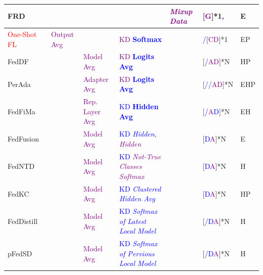 \begin{table}[htp]
\begin{longtable}{|p{1.68cm}|p{1.2cm}|p{1.25cm}|p{5.0cm}|p{2.59cm}|p{1.2cm}|p{0.35cm}|}
    FRD~\cite{cha2019federated}& & & & \textcolor{purple}{\textit{Mixup Data}} &[\textcolor{purple}{G}]*1\textcolor{purple}{,} & E \\ \hline

    \textcolor{red}{One-Shot FL}~\cite{guha2018one} & \textcolor{purple}{Output Avg} & & \textcolor{purple}{KD} \textcolor{blue}{\textbf{Softmax}} & & \textcolor{blue}{/}[\textcolor{purple}{CD}]*1 & EP \\ \hline %

    FedDF~\cite{lin2020ensemble} &  & \textcolor{purple}{Model Avg} & \textcolor{purple}{KD}  \textcolor{blue}{\textbf{Logits Avg}} & & [\textcolor{blue}{/}\textcolor{purple}{AD}]*N & HP \\ \hline %

    PerAda~\cite{xie2023perada} &  & \textcolor{purple}{Adapter Avg} & \textcolor{purple}{KD} \textcolor{blue}{\textbf{Logits Avg}} & & [\textcolor{blue}{//}\textcolor{purple}{AD}]*N & EHP \\ \hline

    FedFiMa~\cite{che2022federated} &  & \textcolor{purple}{Rep. Layer Avg} & \textcolor{blue}{KD} \textcolor{blue}{\textbf{Hidden Avg}} & & [\textcolor{blue}{/}\textcolor{purple}{A}\textcolor{blue}{D}]*N & EH \\ \hline

    FedFusion~\cite{yao2019towards} & & \textcolor{purple}{Model Avg} & \textcolor{blue}{KD} \textcolor{blue}{\textit{Hidden}}, \textcolor{purple}{\textit{Hidden}} & & [\textcolor{blue}{D}\textcolor{purple}{A}]*N & E \\ \hline %

    FedNTD~\cite{lee2022preservation} & & \textcolor{purple}{Model Avg} & \textcolor{blue}{KD} \textcolor{purple}{\textit{Not-True Classes Softmax}} & & [\textcolor{blue}{D}\textcolor{purple}{A}]*N & H \\ \hline %

    FedKC~\cite{wang2022fedkc} & & \textcolor{purple}{Model Avg} & \textcolor{blue}{KD} \textcolor{blue}{\textit{Clustered Hidden Avg}} & & [\textcolor{blue}{D}\textcolor{purple}{A}]*N & HP \\ \hline %

    FedDistill~\cite{jiang2020federated}& & \textcolor{purple}{Model Avg} & \textcolor{blue}{KD \textit{Softmax of Latest Local Model}}& &[\textcolor{blue}{/D}\textcolor{purple}{A}]*N & H \\ \hline %

    pFedSD~\cite{jin2022personalized}& & \textcolor{purple}{Model Avg} & \textcolor{blue}{KD \textit{Softmax of Pervious Local Model}}& &[\textcolor{blue}{/D}\textcolor{purple}{A}]*N & H \\ \hline


\end{longtable}
\end{table}
